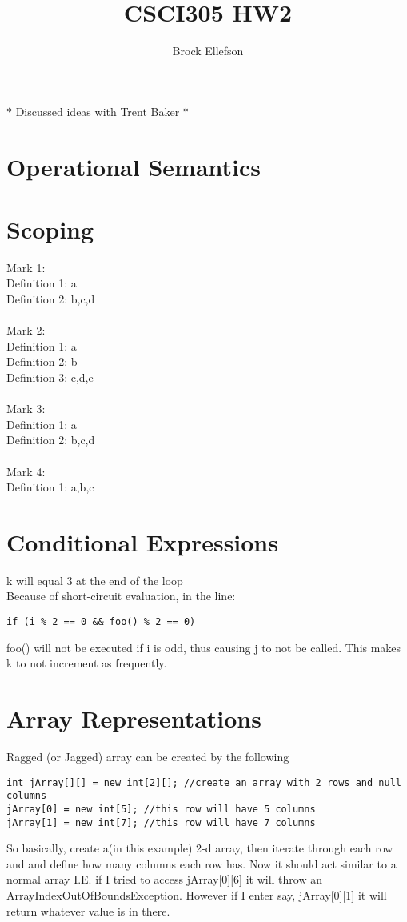 \documentclass[10pt,letterpaper]{article}
\author{Brock Ellefson}
\title{CSCI305 HW2}
\begin{document}
\maketitle
$\ast$ Discussed ideas with Trent Baker $\ast$
\section{Operational Semantics}


\section{Scoping}
Mark 1:\\
Definition 1: a\\
Definition 2: b,c,d\\\\
Mark 2:\\
Definition 1: a\\
Definition 2: b\\
Definition 3: c,d,e\\\\
Mark 3:\\
Definition 1: a\\
Definition 2: b,c,d\\\\
Mark 4:\\
Definition 1: a,b,c
\section{Conditional Expressions}
k will equal 3 at the end of the loop\\
Because of short-circuit evaluation, in the line:
\begin{verbatim}
if (i % 2 == 0 && foo() % 2 == 0)
\end{verbatim}
foo() will not be executed if i is odd, thus causing j to not be called. This makes k to not increment as frequently. 

\section{Array Representations}

Ragged (or Jagged) array can be created by the following
\begin{verbatim}
int jArray[][] = new int[2][]; //create an array with 2 rows and null columns 
jArray[0] = new int[5]; //this row will have 5 columns
jArray[1] = new int[7]; //this row will have 7 columns
\end{verbatim}
So basically, create a(in this example) 2-d array, then iterate through each row and and define how many columns each row has. Now it should act similar to a normal array I.E. if I tried to access jArray[0][6] it will throw an ArrayIndexOutOfBoundsException. However if I enter say, jArray[0][1] it will return whatever value is in there.
\end{document}
